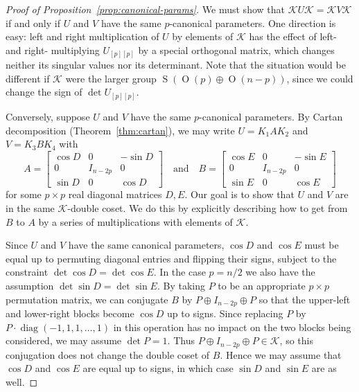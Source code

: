 \documentclass[reqno]{amsart}
\theoremstyle{definition} \newtheorem{example}[theorem]{Example}
\renewcommand{\O}{\operatorname{O}}
\newcommand{\diag}{\operatorname{diag}}
\renewcommand{\S}{\operatorname{S}}
\newcommand{\K}{\mathcal{K}}
\begin{document}
\begin{proof}[Proof of Proposition~\ref{prop:canonical-params}]
We must show that $\K U \K = \K V \K$ if and only if $U$ and $V$ have the same $p$-canonical parameters. One direction is easy: left and right multiplication of $U$ by elements of $\K$ has the effect of left- and right- multiplying $U_{[p][p]}$ by a special orthogonal matrix, which changes neither its singular values nor its determinant. Note that the situation would be different if $\K$ were the larger group $\S(\O(p) \oplus \O(n-p))$, since we could change the sign of $\det U_{[p][p]}$.

Conversely, suppose $U$ and $V$ have the same $p$-canonical parameters.  By Cartan decomposition (Theorem~\ref{thm:cartan}), we may write $U = K_1 A  K_2$ and $V = K_3 B K_4$ with
\begin{equation*}
A = \begin{bmatrix} \cos D & 0 & -\sin D \\ 0 & I_{n-2p} & 0 \\ \sin D & 0 & \cos D \end{bmatrix} \quad \text{and} \quad B = \begin{bmatrix} \cos E & 0 & -\sin E \\ 0 & I_{n-2p} & 0 \\ \sin E & 0 & \cos E \end{bmatrix}
\end{equation*}
for some $p \times p$ real diagonal matrices $D,E$. Our goal is to show that $U$ and $V$ are in the same $\K$-double coset. We do this by explicitly describing how to get from $B$ to $A$ by a series of multiplications with elements of $\K$.

Since $U$ and $V$ have the same canonical parameters, $\cos D$ and $\cos E$ must be equal up to permuting diagonal entries and flipping their signs, subject to the constraint $\det \cos D = \det \cos E$. In the case $p = n/2$ we also have the assumption $\det \sin D = \det \sin E$.  By taking $P$ to be an appropriate $p \times p$ permutation matrix, we can conjugate $B$ by $P \oplus I_{n-2p} \oplus P$ so that the upper-left and lower-right blocks become $\cos D$ up to signs. Since replacing $P$ by $P \cdot \diag(-1,1,1,\ldots,1)$ in this operation has no impact on the two blocks being considered, we may assume $\det P = 1$. Thus $P \oplus I_{n-2p} \oplus P \in \K$, so this conjugation does not change the double coset of $B$. Hence we may assume that $\cos D$ and $\cos E$ are equal up to signs, in which case $\sin D$ and $\sin E$ are as well.


\end{proof}
\end{document}

